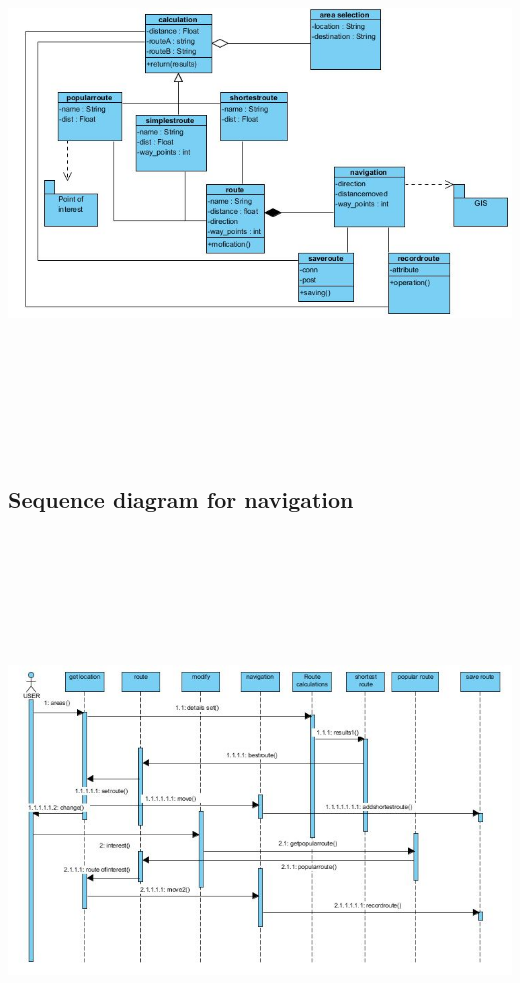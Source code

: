 \documentclass[10pt]{article}
\begin{document}
\includegraphics[width=8in, height=6in]{NCD.JPG} \\
\pagebreak
\subsection{Sequence diagram for navigation}

\includegraphics[width=8in, height=6in]{NSD.JPG} 
\end{document}

